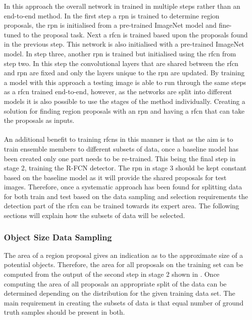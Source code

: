 In this approach the overall network in trained in multiple steps rather than an end-to-end method. In the first step a \gls{rpn} is trained to determine region proposals, the \gls{rpn} is initialised from a pre-trained ImageNet model and fine-tuned to the proposal task. Next a \gls{rfcn} is trained based upon the proposals found in the previous step. This network is also initialised with a pre-trained ImageNet model. In step three, another \gls{rpn} is trained but initialised using the \gls{rfcn} from step two. In this step the convolutional layers that are shared between the \gls{rfcn} and \gls{rpn} are fixed and only the layers unique to the \gls{rpn} are updated. By training a model with this approach a testing image is able to run through the same steps as a \gls{rfcn} trained end-to-end, however, as the networks are split into different models it is also possible to use the stages of the method individually. Creating a solution for finding region proposals with an \gls{rpn} and having a \gls{rfcn} that can take the proposals as inputs. 
\\\\
An additional benefit to training \glspl{rfcn} in this manner is that as the aim is to train ensemble members to different subsets of data, once a baseline model has been created only one part needs to be re-trained. This being the final step in stage 2, training the R-FCN detector. The \gls{rpn} in stage 3 should be kept constant based on the baseline model as it will provide the shared proposals for test images. Therefore, once a systematic approach has been found for splitting data for both train and test based on the data sampling and selection requirements the detection part of the \gls{rfcn} can be trained towards its expert area. The following sections will explain how the subsets of data will be selected.

\subsubsection{Object Size Data Sampling}
The area of a region proposal gives an indication as to the approximate size of a potential objects. Therefore, the area for all proposals on the training set can be computed from the output of the second step in stage 2 shown in . Once computing the area of all proposals an appropriate split of the data can be determined depending on the distribution for the given training data set. The main requirement in creating the subsets of data is that equal number of ground truth samples should be present in both.

